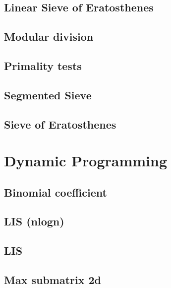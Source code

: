 \subsection{Linear Sieve of Eratosthenes}
\raggedbottom
\hrulefill
\subsection{Modular division}
\raggedbottom
\hrulefill
\subsection{Primality tests}
\raggedbottom
\hrulefill
\subsection{Segmented Sieve}
\raggedbottom
\hrulefill
\subsection{Sieve of Eratosthenes}
\raggedbottom
\hrulefill

\section{Dynamic Programming}
\subsection{Binomial coefficient}
\raggedbottom
\hrulefill
\subsection{LIS (nlogn)}
\raggedbottom
\hrulefill
\subsection{LIS}
\raggedbottom
\hrulefill
\subsection{Max submatrix 2d}
\raggedbottom
\hrulefill

